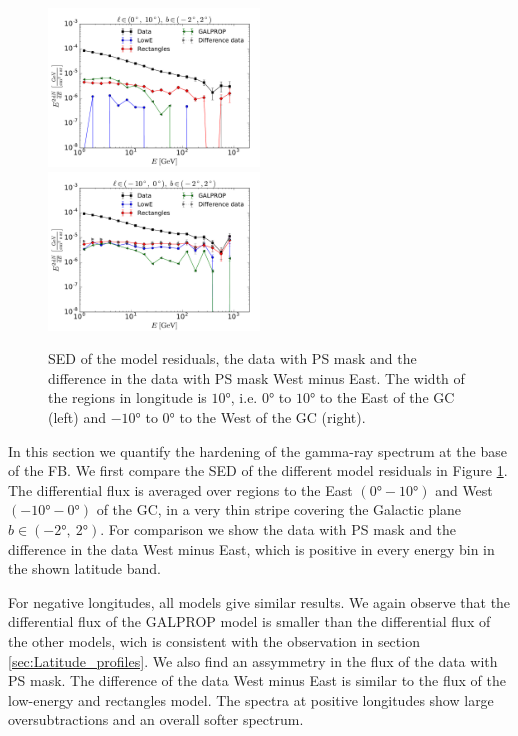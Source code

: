 \begin{figure}[h]
\includegraphics[width=0.5\textwidth]{plots/SED_all_models_source_l=5_b=0.pdf}
\includegraphics[width=0.5\textwidth]{plots/SED_all_models_source_l=-5_b=0.pdf}
  	\caption{SED of the model residuals, the data with PS mask and the difference in the data with PS mask West minus East. The width of the regions in longitude is $\ang{10}$, i.e. $\ang{0}$ to $\ang{10}$ to the East of the GC (left) and $\ang{-10}$ to $\ang{0}$ to the West of the GC (right).}
  	\label{fig:SED_all}
\end{figure}

In this section we quantify the hardening of the gamma-ray spectrum at the base of the FB. 
We first compare the SED of the different model residuals in Figure \ref{fig:SED_all}. 
The differential flux is averaged over regions to the East $(\ang{0} - \ang{10})$ and West $(\ang{-10} - \ang{0})$ of the GC, 
in a very thin stripe covering the Galactic plane $b \in (\ang{-2},\ \ang{2})$. 
For comparison we show the data with PS mask and the difference in the data West minus East, 
which is positive in every energy bin in the shown latitude band.

For negative longitudes, all models give similar results. We again observe that the differential flux of the GALPROP model is smaller than the differential flux of the other models, wich is consistent with the observation in section \ref{sec:Latitude_profiles}. We also find an assymmetry in the flux of the data with PS mask. The difference of the data West minus East is similar to the flux of the low-energy and rectangles model. The spectra at positive longitudes show large oversubtractions and an overall softer spectrum. %

